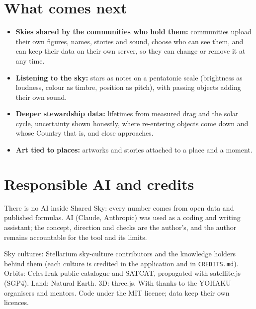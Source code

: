 \documentclass[11pt,a4paper]{article}
\begin{document}
\section{What comes next}
\begin{itemize}\itemsep1pt
\item \textbf{Skies shared by the communities who hold them:} communities upload their own figures, names, stories and sound, choose who can see them, and can keep their data on their own server, so they can change or remove it at any time.
\item \textbf{Listening to the sky:} stars as notes on a pentatonic scale (brightness as loudness, colour as timbre, position as pitch), with passing objects adding their own sound.
\item \textbf{Deeper stewardship data:} lifetimes from measured drag and the solar cycle, uncertainty shown honestly, where re-entering objects come down and whose Country that is, and close approaches.
\item \textbf{Art tied to places:} artworks and stories attached to a place and a moment.
\end{itemize}

\section*{Responsible AI and credits}
\small
There is no AI inside Shared Sky: every number comes from open data and published formulas. AI (Claude, Anthropic) was used as a coding and writing assistant; the concept, direction and checks are the author's, and the author remains accountable for the tool and its limits.

Sky cultures: Stellarium sky-culture contributors and the knowledge holders behind them (each culture is credited in the application and in \texttt{CREDITS.md}). Orbits: CelesTrak public catalogue and SATCAT, propagated with satellite.js (SGP4). Land: Natural Earth. 3D: three.js. With thanks to the YOHAKU organisers and mentors. Code under the MIT licence; data keep their own licences.
\end{document}
